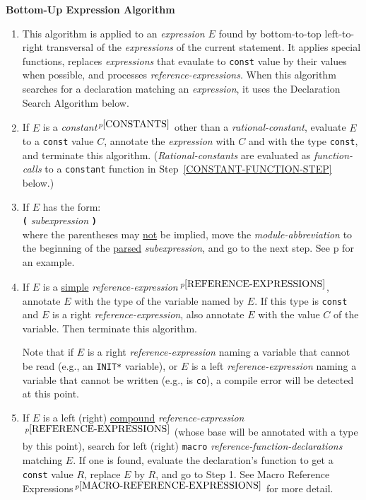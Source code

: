 \documentclass[12pt]{article}
\newcommand{\TT}[1]{{\tt \bfseries #1}}
\newcommand{\pagref}[1]{p\pageref{#1}}
\newcommand{\pagnote}[1]{$\,^{p\pageref{#1}}$}
\begin{document}
\centerline{\bf Bottom-Up Expression Algorithm}
\begin{enumerate}

\item This algorithm is applied to an {\em expression} $E$ found by
bottom-to-top left-to-right transversal of the {\em expressions} of the
current statement.  It applies special functions, replaces
{\em expressions} that evaulate to {\tt const} value by their values
when possible, and processes {\em reference-expressions}.
When this algorithm searches for a declaration matching an {\em expression},
it uses the Declaration Search Algorithm below.

\item\label{CONSTANT-STEP}
If $E$ is a {\em constant}\pagnote{CONSTANTS} other than
a {\em rational-constant}, evaluate $E$
to a {\tt const} value $C$, annotate the
{\em expression} with $C$ and with the type {\tt const},
and terminate this algorithm.
({\em Rational-constants} are evaluated as {\em function-calls} to
a {\tt constant} function in Step~\ref{CONSTANT-FUNCTION-STEP} below.)

\item\label{MODULE-PROPAGATION-STEP}
If $E$ has the form: \\
\hspace*{2in}{\em module-abbreviation} \TT{(} {\em subexpression} \TT{)} \\
where the parentheses may \underline{not}
be implied, move the {\em module-abbreviation}
to the beginning of the \underline{parsed} {\em subexpression}, and
go to the next step.
See \pagref{MA-SYNTACTIC-SUGAR} for an example.

\item\label{SIMPLE-REFERENCE-STEP}
If $E$ is a \underline{simple}
{\em reference-expression}\pagnote{REFERENCE-EXPRESSIONS},
annotate $E$ with the type of the variable named by $E$.  If
this type is {\tt const} and $E$ is a right {\em reference-expression},
also annotate $E$ with the value $C$ of the variable.  Then
terminate this algorithm.

Note that if $E$ is a right {\em reference-expression} naming a
variable that cannot be read (e.g., an {\tt *INIT*} variable),
or $E$ is a left {\em reference-expression} naming a variable
that cannot be written (e.g., is {\tt co}),
a compile error will be detected at this point.

\item\label{MACRO-REFERENCE-FUNCTION-STEP}
If $E$ is a left (right) \underline{compound}
{\em reference-expression}\pagnote{REFERENCE-EXPRESSIONS} (whose
base will be annotated with a type by this point),
search for left (right) {\tt macro}
{\em reference-function-declarations} matching $E$.  If one is found,
evaluate the declaration's function to get a {\tt const} value $R$,
replace $E$ by $R$, and go to Step 1.
See Macro Reference Expressions\pagnote{MACRO-REFERENCE-EXPRESSIONS}
for more detail.


\end{enumerate}
\end{document}

